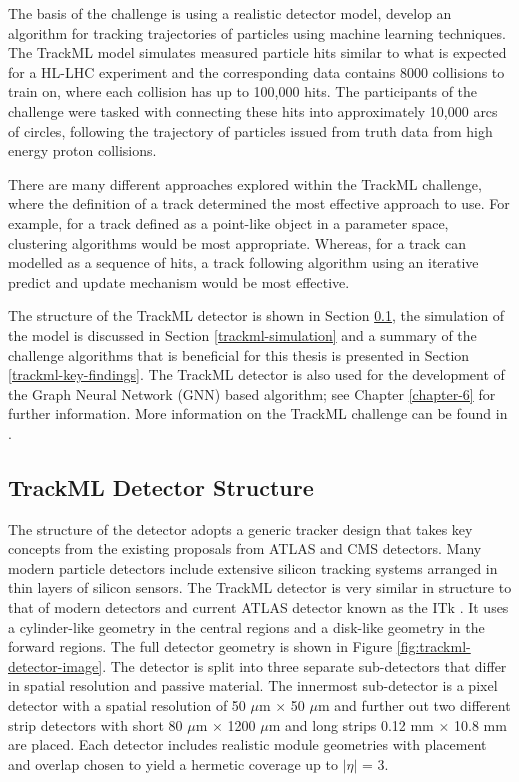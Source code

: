 The basis of the challenge is using a realistic detector model, develop an algorithm for tracking trajectories of particles using machine learning techniques. The TrackML model simulates measured particle hits similar to what is expected for a HL-LHC experiment and the corresponding data contains 8000 collisions to train on, where each collision has up to 100,000 hits. The participants of the challenge were tasked with connecting these hits into approximately 10,000 arcs of circles, following the trajectory of particles issued from truth data from high energy proton collisions. 

There are many different approaches explored within the TrackML challenge, where the definition of a track determined the most effective approach to use. For example, for a track defined as a point-like object in a parameter space, clustering algorithms would be most appropriate. Whereas, for a track can modelled as a sequence of hits, a track following algorithm using an iterative predict and update mechanism would be most effective.

The structure of the TrackML detector is shown in Section \ref{trackml-structure}, the simulation of the model is discussed in Section \ref{trackml-simulation} and a summary of the challenge algorithms that is beneficial for this thesis is presented in Section \ref{trackml-key-findings}. The TrackML detector is also used for the development of the Graph Neural Network (GNN) based algorithm; see Chapter \ref{chapter-6} for further information. More information on the TrackML challenge can be found in \cite{Amrouche_2019}.

\subsection{TrackML Detector Structure}
\label{trackml-structure}
The structure of the detector adopts a generic tracker design that takes key concepts from the existing proposals from ATLAS and CMS detectors. Many modern particle detectors include extensive silicon tracking systems arranged in thin layers of silicon sensors. The TrackML detector is very similar in structure to that of modern detectors and current ATLAS detector known as the ITk \cite{inner-detector-TDR}. It uses a cylinder-like geometry in the central regions and a disk-like geometry in the forward regions. The full detector geometry is shown in Figure \ref{fig:trackml-detector-image}. The detector is split into three separate sub-detectors that differ in spatial resolution and passive material. The innermost sub-detector is a pixel detector with a spatial resolution of 50 $\mu$m $\times$ 50 $\mu$m and further out two different strip detectors with short 80 $\mu$m × 1200 $\mu$m and long strips 0.12 mm $\times$ 10.8 mm are placed. Each detector includes realistic module geometries with placement and overlap chosen to yield a hermetic coverage up to $\lvert \eta \rvert$ = 3.

